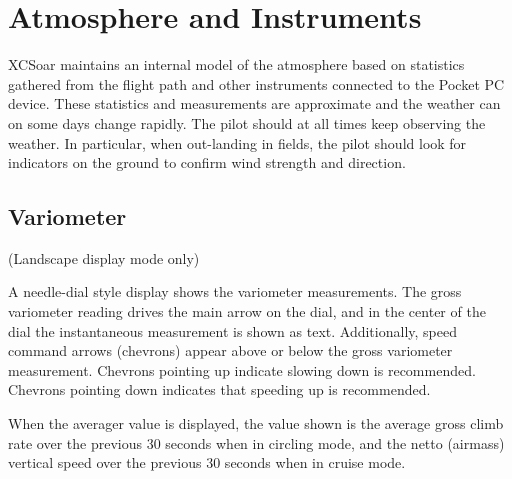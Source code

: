 \chapter{Atmosphere and Instruments}\label{cha:atmosph}
XCSoar maintains an internal model of the atmosphere based on
statistics gathered from the flight path and other instruments
connected to the Pocket PC device.  These statistics and measurements
are approximate and the weather can on some days change rapidly.  The
pilot should at all times keep observing the weather.  In
particular, when out-landing in fields, the pilot should look for
indicators on the ground to confirm wind strength and direction.

\section{Variometer}

(Landscape display mode only)

A needle-dial style display shows the variometer measurements.  The
gross variometer reading drives the main arrow on the dial, and in the
center of the dial the instantaneous measurement is shown as text.
Additionally, speed command arrows (chevrons) appear above or below
the gross variometer measurement.  Chevrons pointing up indicate
slowing down is recommended.  Chevrons pointing down indicates that
speeding up is recommended.  

When the averager value is displayed, the value shown is the average
gross climb rate over the previous 30 seconds when in circling mode,
and the netto (airmass) vertical speed over the previous 30 seconds
when in cruise mode.


